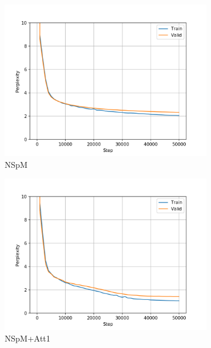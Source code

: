 \begin{figure}[H]
\centering
\begin{subfigure}{0.45\textwidth}
\includegraphics[width=\textwidth]{../results/dbnqa1/run1/neural_sparql_machine/ppls.png} 
\caption{NSpM}
\label{fig:dbnqa nsm ppl}
\end{subfigure}
\hfill
\begin{subfigure}{0.45\textwidth}
\includegraphics[width=\textwidth]{../results/dbnqa1/run1/neural_sparql_machine_bahdanau_attention/ppls.png}
\caption{NSpM+Att1}
\label{fig:dbnqa nsm-bah ppl}
\end{subfigure}
\hfill
\begin{subfigure}{0.45\textwidth}

\end{subfigure}
\end{figure}
